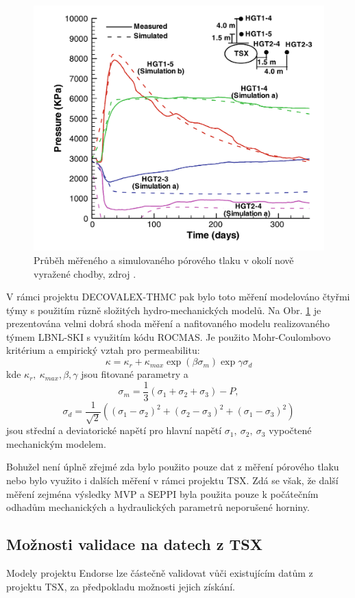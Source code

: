 \documentclass{article}
\begin{document}
\begin{figure}
\label{fig:TSX}
\includegraphics[width=\textwidth]{graphics/TSX_measurement.png}
\caption{Průběh měřeného a simulovaného pórového tlaku v okolí nově vyražené chodby, zdroj \cite{Rutqvist2009}.}
\end{figure}

V rámci projektu DECOVALEX-THMC pak bylo toto měření modelováno čtyřmi týmy s použitím různě složitých hydro-mechanických 
modelů. Na Obr. \ref{fig:TSX} je prezentována velmi dobrá shoda měření a nafitovaného modelu realizovaného týmem LBNL-SKI s využitím kódu ROCMAS. Je použito Mohr-Coulombovo kritérium a empirický vztah 
pro permeabilitu:
\[
   \kappa = \kappa_r + \kappa_{max} \exp(\beta \sigma_m) \exp{\gamma\sigma_d}
\]
kde $\kappa_r,\ \kappa_{max}, \beta, \gamma$ jsou fitované parametry a 
\[
  \sigma_m = \frac{1}{3}(\sigma_1 + \sigma_2 + \sigma_3) - P,
\]
\[
  \sigma_d = \frac{1}{\sqrt{2}}((\sigma_1 - \sigma_2)^2 + (\sigma_2-\sigma_3)^2 + (\sigma_1 - \sigma_3)^2)
\]
jsou střední a deviatorické napětí pro hlavní napětí $\sigma_1,\ \sigma_2,\ \sigma_3$ vypočtené mechanickým modelem.

Bohužel není úplně zřejmé zda bylo použito pouze dat z měření pórového tlaku nebo bylo využito i dalších měření v rámci projektu TSX.
Zdá se však, že další měření zejména výsledky MVP a SEPPI byla použita pouze k počátečním odhadům mechanických a hydraulických parametrů neporušené horniny.


\subsection{Možnosti validace na datech z TSX}
Modely projektu Endorse lze částečně validovat vůči existujícím datům z projektu TSX, 
za předpokladu možnosti jejich získání. 
\end{document}
